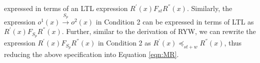 \documentclass[journal,compsoc]{IEEEtran}
\begin{document}
  expressed in terms of an LTL expression
    $R^{'}(x) F_\mathit{st} R^{''}(x) $.   Similarly, the expression $\mathit{o}^1(x) \xrightarrow{S_p} \mathit{o}^2(x)$ in Condition 2
  can be expressed in terms of LTL as $R^{'}(x) F_{S_p} R^{''}(x)$. 
    Further, similar to the derivation of RYW,  we can rewrite the expression $R^{'}(x) F_{S_p} R^{''}(x) $ in Condition 2 as  $R^{'}(x) \preccurlyeq_{\mathit{st}+w} R^{''}(x)$, thus reducing the above specification  into Equation \ref{eqn:MR}. 
\end{document}
